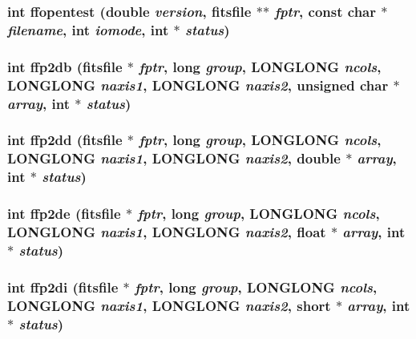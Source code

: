 \subsubsection{\setlength{\rightskip}{0pt plus 5cm}int ffopentest (double {\em version}, \bf{fitsfile} $\ast$$\ast$ {\em fptr}, const char $\ast$ {\em filename}, int {\em iomode}, int $\ast$ {\em status})}\label{src_2fitsio_8h_9c71ba8e466791b2eac6de1ca9848f4c}


\subsubsection{\setlength{\rightskip}{0pt plus 5cm}int ffp2db (\bf{fitsfile} $\ast$ {\em fptr}, long {\em group}, \bf{LONGLONG} {\em ncols}, \bf{LONGLONG} {\em naxis1}, \bf{LONGLONG} {\em naxis2}, unsigned char $\ast$ {\em array}, int $\ast$ {\em status})}\label{src_2fitsio_8h_8e43e1cab4a5cdaa87d44ed10bd52298}


\subsubsection{\setlength{\rightskip}{0pt plus 5cm}int ffp2dd (\bf{fitsfile} $\ast$ {\em fptr}, long {\em group}, \bf{LONGLONG} {\em ncols}, \bf{LONGLONG} {\em naxis1}, \bf{LONGLONG} {\em naxis2}, double $\ast$ {\em array}, int $\ast$ {\em status})}\label{src_2fitsio_8h_8add04b815d7489f9beeb3dd43857843}


\subsubsection{\setlength{\rightskip}{0pt plus 5cm}int ffp2de (\bf{fitsfile} $\ast$ {\em fptr}, long {\em group}, \bf{LONGLONG} {\em ncols}, \bf{LONGLONG} {\em naxis1}, \bf{LONGLONG} {\em naxis2}, float $\ast$ {\em array}, int $\ast$ {\em status})}\label{src_2fitsio_8h_d22120fc89698ea1c5d54ec66c038dce}


\subsubsection{\setlength{\rightskip}{0pt plus 5cm}int ffp2di (\bf{fitsfile} $\ast$ {\em fptr}, long {\em group}, \bf{LONGLONG} {\em ncols}, \bf{LONGLONG} {\em naxis1}, \bf{LONGLONG} {\em naxis2}, short $\ast$ {\em array}, int $\ast$ {\em status})}\label{src_2fitsio_8h_0fa81f7a8cdf97afcb174e6dc024f080}


